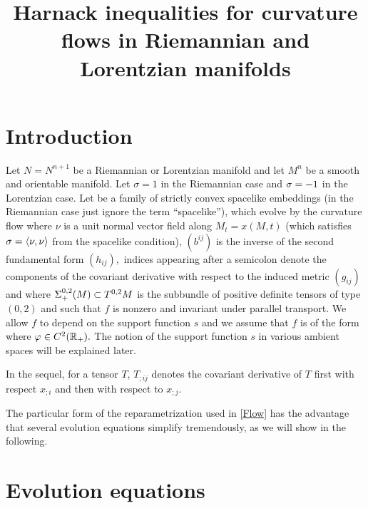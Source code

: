 




\title[Harnack inequalities for curvature flows]{Harnack inequalities for curvature flows in Riemannian and Lorentzian manifolds}

\maketitle
\section{Introduction}
Let $N=N^{n+1}$ be a Riemannian or Lorentzian manifold and let $M^{n}$ be a smooth and orientable manifold. Let $\sigma = 1$ in the Riemannian case and $\sigma = -1$ in the Lorentzian case. Let
\eq{x\cn M^{n}\x[0,T)\ra N}
be a family of strictly convex spacelike embeddings (in the Riemannian case just ignore the term ``spacelike''), which evolve by the curvature flow
where $\nu$ is a unit normal vector field along $M_{t}=x(M,t)$ (which satisfies $\sigma=\left\langle \nu,\nu \right\rangle$ from the spacelike condition), $(b^{ij})$ is the inverse of the second fundamental form $(h_{ij}),$ indices appearing after a semicolon denote the components of the covariant derivative with respect to the induced metric $(g_{ij})$ and
where $\Sigma^{0,2}_{+}(M)\subset T^{0,2}M$ is the subbundle of positive definite tensors of type $(0,2)$ and such that $f$ is nonzero and invariant under parallel transport.
We allow $f$ to depend on the support function $s$ and we assume that $f$ is of the form
where $\varphi\in C^2(\mathbb{R}_+).$
The notion of the support function $s$ in various ambient spaces will be explained later.

In the sequel, for a tensor $T$, $T_{;ij}$ denotes the covariant derivative of $T$ first with respect $x_{;i}$ and then with respect to $x_{;j}.$ 

The particular form of the reparametrization used in \eqref{Flow} has the advantage that several evolution equations simplify tremendously, as we will show in the following.

\section{Evolution equations}

